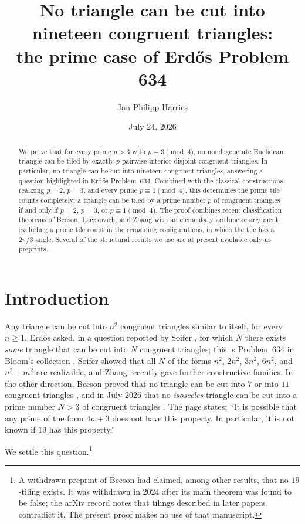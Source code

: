 \documentclass[11pt]{amsart}
\title[The prime case of Erd\H{o}s Problem 634]{No triangle can be cut into nineteen congruent triangles:\\ the prime case of Erd\H{o}s Problem 634}
\author{Jan Philipp Harries}
\date{July 24, 2026}
\theoremstyle{remark}
\begin{document}
\begin{abstract}
We prove that for every prime $p>3$ with $p\equiv 3 \pmod 4$, no nondegenerate Euclidean triangle can be tiled by exactly $p$ pairwise interior-disjoint congruent triangles. In particular, no triangle can be cut into nineteen congruent triangles, answering a question highlighted in Erd\H{o}s Problem~634. Combined with the classical constructions realizing $p=2$, $p=3$, and every prime $p\equiv 1\pmod 4$, this determines the prime tile counts completely: a triangle can be tiled by a prime number $p$ of congruent triangles if and only if $p=2$, $p=3$, or $p\equiv 1\pmod 4$. The proof combines recent classification theorems of Beeson, Laczkovich, and Zhang with an elementary arithmetic argument excluding a prime tile count in the remaining configurations, in which the tile has a $2\pi/3$ angle. Several of the structural results we use are at present available only as preprints.
\end{abstract}

\maketitle

\section{Introduction}

Any triangle can be cut into $n^2$ congruent triangles similar to itself, for every $n\ge 1$. Erd\H{o}s asked, in a question reported by Soifer \cite{Soifer09}, for which $N$ there exists \emph{some} triangle that can be cut into $N$ congruent triangles; this is Problem~634 in Bloom's collection \cite{EP634}. Soifer showed that all $N$ of the forms $n^2$, $2n^2$, $3n^2$, $6n^2$, and $n^2+m^2$ are realizable, and Zhang \cite{Zhang25} recently gave further constructive families. In the other direction, Beeson proved that no triangle can be cut into $7$ or into $11$ congruent triangles \cite{Beeson7}, and in July 2026 that no \emph{isosceles} triangle can be cut into a prime number $N>3$ of congruent triangles \cite{BeesonPrime}. The page \cite{EP634} states: ``It is possible that any prime of the form $4n+3$ does not have this property. In particular, it is not known if $19$ has this property.''

We settle this question.\footnote{A withdrawn preprint of Beeson \cite{Beeson2228} had claimed, among other results, that no $19$-tiling exists. It was withdrawn in 2024 after its main theorem was found to be false; the arXiv record notes that tilings described in later papers contradict it. The present proof makes no use of that manuscript.}
\end{document}
